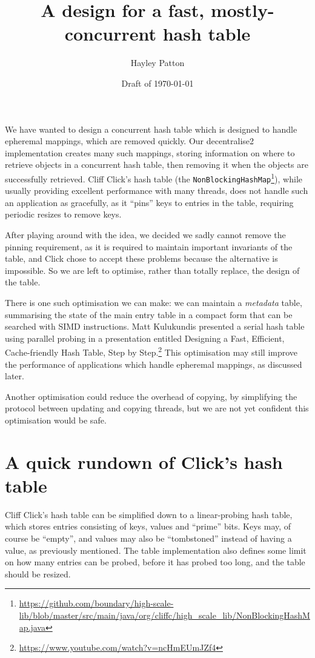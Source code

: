\documentclass{article}
\begin{document}
\title{A design for a fast, mostly-concurrent hash table}
\author{Hayley Patton}
\date{Draft of \today}
\maketitle

We have wanted to design a concurrent hash table which is designed to
handle epheremal mappings, which are removed quickly. Our decentralise2
implementation creates many such mappings, storing information on where
to retrieve objects in a concurrent hash table, then removing it when
the objects are successfully retrieved. Cliff Click's hash table (the
\texttt{NonBlockingHashMap}\footnote{\url{https://github.com/boundary/high-scale-lib/blob/master/src/main/java/org/cliffc/high_scale_lib/NonBlockingHashMap.java}}),
while usually providing excellent performance with many threads, does
not handle such an application as gracefully, as it ``pins'' keys to
entries in the table, requiring periodic resizes to remove keys.

After playing around with the idea, we decided we sadly cannot remove
the pinning requirement, as it is required to maintain important
invariants of the table, and Click chose to accept these problems
because the alternative is impossible. So we are left to optimise,
rather than totally replace, the design of the table.

There is one such optimisation we can make: we can maintain a
\emph{metadata} table, summarising the state of the main entry table
in a compact form that can be searched with SIMD instructions. Matt
Kulukundis presented a serial hash table using parallel probing in a
presentation entitled Designing a Fast, Efficient, Cache-friendly Hash
Table, Step by Step.\footnote{
  \url{https://www.youtube.com/watch?v=ncHmEUmJZf4}} This
optimisation may still improve the performance of applications which
handle epheremal mappings, as discussed later.

Another optimisation could reduce the overhead of copying, by simplifying
the protocol between updating and copying threads, but we are not yet
confident this optimisation would be safe.

\section{A quick rundown of Click's hash table}

Cliff Click's hash table can be simplified down to a linear-probing hash
table, which stores entries consisting of keys, values and ``prime''
bits. Keys may, of course be ``empty'', and values may also be
``tombstoned'' instead of having a value, as previously mentioned. The
table implementation also defines some limit on how many entries can be
probed, before it has probed too long, and the table should be resized.
\end{document}
